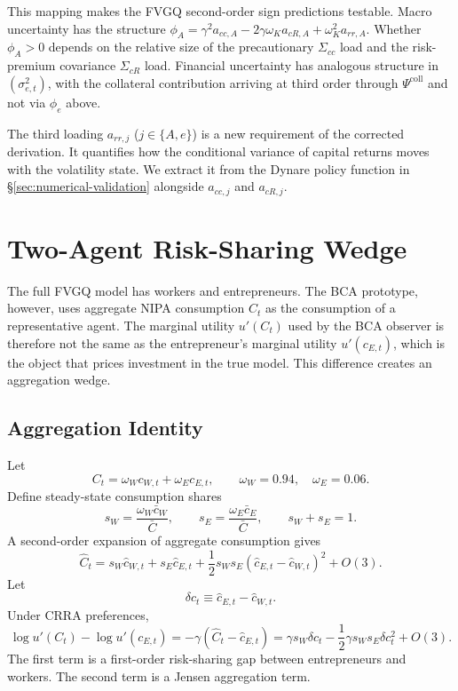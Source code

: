 \documentclass[11pt]{article}
\theoremstyle{plain}
\theoremstyle{definition}
\begin{document}
This mapping makes the FVGQ second-order sign predictions testable. Macro
uncertainty has the structure $\phi_A = \gamma^2 a_{cc,A} - 2\gamma\omega_K
a_{cR,A} + \omega_K^2 a_{rr,A}$. Whether $\phi_A>0$ depends on the relative
size of the precautionary $\Sigma_{cc}$ load and the risk-premium covariance
$\Sigma_{cR}$ load. Financial uncertainty has analogous structure in
$(\sigma_{e,t}^2)$, with the collateral contribution arriving at third order
through $\Psi^{\mathrm{coll}}$ and not via $\phi_e$ above.

The third loading $a_{rr,j}$ ($j\in\{A,e\}$) is a new requirement of the
corrected derivation. It quantifies how the conditional variance of capital
returns moves with the volatility state. We extract it from the Dynare policy
function in §\ref{sec:numerical-validation} alongside $a_{cc,j}$ and
$a_{cR,j}$.

\section{Two-Agent Risk-Sharing Wedge}
\label{sec:two-agent}

The full FVGQ model has workers and entrepreneurs. The BCA prototype, however,
uses aggregate NIPA consumption $C_t$ as the consumption of a representative
agent. The marginal utility $u'(C_t)$ used by the BCA observer is therefore not
the same as the entrepreneur's marginal utility $u'(c_{E,t})$, which is the
object that prices investment in the true model. This difference creates an
aggregation wedge.

\subsection{Aggregation Identity}

Let
\[
C_t=\omega_W c_{W,t}+\omega_E c_{E,t},
\qquad
\omega_W=0.94,\quad \omega_E=0.06.
\]
Define steady-state consumption shares
\[
s_W=\frac{\omega_W\bar c_W}{\bar C},
\qquad
s_E=\frac{\omega_E\bar c_E}{\bar C},
\qquad
s_W+s_E=1.
\]
A second-order expansion of aggregate consumption gives
\begin{equation}
\hat C_t
=
s_W\hat c_{W,t}+s_E\hat c_{E,t}
+\frac{1}{2}s_Ws_E(\hat c_{E,t}-\hat c_{W,t})^2
+O(3).
\tag{Agg-C}
\end{equation}
Let
\[
\delta c_t\equiv\hat c_{E,t}-\hat c_{W,t}.
\]
Under CRRA preferences,
\[
\log u'(C_t)-\log u'(c_{E,t})
=
-\gamma(\hat C_t-\hat c_{E,t})
=
\gamma s_W\delta c_t
-\frac{1}{2}\gamma s_Ws_E\delta c_t^2
+O(3).
\tag{MU-gap}
\]
The first term is a first-order risk-sharing gap between entrepreneurs and
workers. The second term is a Jensen aggregation term.
\end{document}
